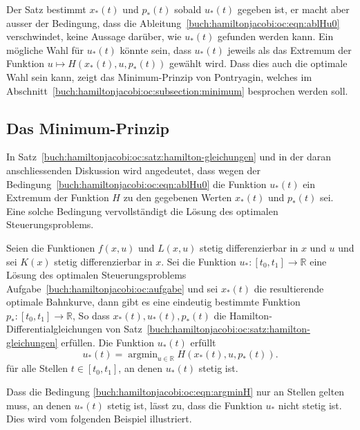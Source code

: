 Der Satz bestimmt $x_*(t)$ und $p_*(t)$ sobald $u_*(t)$ gegeben ist,
er macht aber ausser der Bedingung, dass die
Ableitung~\eqref{buch:hamiltonjacobi:oc:eqn:ablHu0} verschwindet,
keine Aussage darüber, wie $u_*(t)$ gefunden werden kann.
Ein mögliche Wahl für $u_*(t)$ könnte sein, dass $u_*(t)$ jeweils
als das Extremum der Funktion $u\mapsto H(x_*(t),u,p_*(t))$
gewählt wird.
Dass dies auch die optimale Wahl sein kann, zeigt das Minimum-Prinzip
von Pontryagin, welches im
Abschnitt~\ref{buch:hamiltonjacobi:oc:subsection:minimum}
besprochen werden soll.

%
%
\subsection{Das Minimum-Prinzip
\label{buch:hamiltonjacobi:oc:subsection:minimum}}
In Satz~\ref{buch:hamiltonjacobi:oc:satz:hamilton-gleichungen}
und in der daran anschliessenden Diskussion wird angedeutet, dass
wegen der Bedingung~\eqref{buch:hamiltonjacobi:oc:eqn:ablHu0}
die Funktion $u_*(t)$ ein Extremum der Funktion $H$ zu den gegebenen
Werten $x_*(t)$ und $p_*(t)$ sei.
Eine solche Bedingung vervollständigt die Lösung des optimalen
Steuerungsproblems.

\begin{satz}[Pontryagin]
Seien die Funktionen $f(x,u)$ und $L(x,u)$ stetig differenzierbar in 
$x$ und $u$ und sei $K(x)$ stetig differenzierbar in $x$.
Sei die Funktion $u_*\colon[t_0,t_1]\to\mathbb{R}$ eine Lösung des
optimalen Steuerungsproblems Aufgabe~\ref{buch:hamiltonjacobi:oc:aufgabe}
und sei $x_*(t)$ die resultierende optimale Bahnkurve, dann gibt es
eine eindeutig bestimmte Funktion $p_*\colon[t_0,t_1]\to\mathbb{R}$,
So dass $x_*(t),u_*(t),p_*(t)$ die Hamilton-Differentialgleichungen
von Satz~\ref{buch:hamiltonjacobi:oc:satz:hamilton-gleichungen}
erfüllen.
Die Funktion $u_*(t)$ erfüllt
\begin{equation}
u_*(t)
=
\operatorname{argmin}_{u\in\mathbb{R}} H(x_*(t),u,p_*(t)).
\label{buch:hamiltonjacobi:oc:eqn:argminH}
\end{equation}
für alle Stellen $t\in[t_0,t_1]$, an denen $u_*(t)$ stetig ist.
\end{satz}

Dass die Bedingung \eqref{buch:hamiltonjacobi:oc:eqn:argminH} nur
an Stellen gelten muss, an denen $u_*(t)$ stetig ist, lässt zu,
dass die Funktion $u_*$ nicht stetig ist.
Dies wird vom folgenden Beispiel illustriert.



